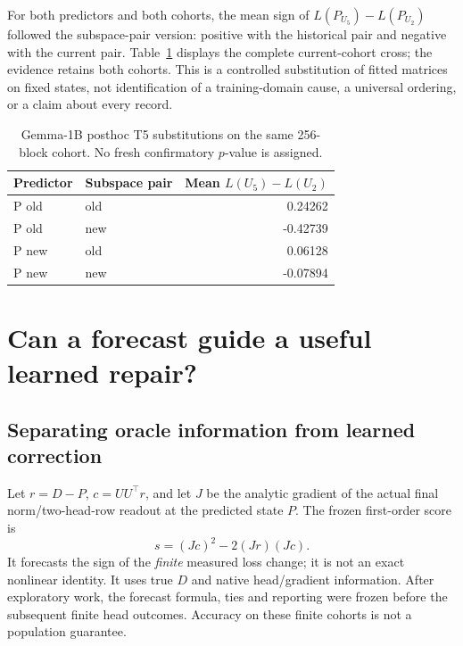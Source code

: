 For both predictors and both cohorts, the mean sign of $L(P_{U_5})-L(P_{U_2})$ followed the subspace-pair version: positive with the historical pair and negative with the current pair. Table~\ref{tab:crossed} displays the complete current-cohort cross; the evidence retains both cohorts. This is a controlled substitution of fitted matrices on fixed states, not identification of a training-domain cause, a universal ordering, or a claim about every record.
\begin{table}[ht]\centering\small
\begin{tabular}{llr}\toprule Predictor & Subspace pair & Mean $L(U_5)-L(U_2)$\\\midrule
P old & old & 0.24262 \\
P old & new & -0.42739 \\
P new & old & 0.06128 \\
P new & new & -0.07894 \\
\bottomrule\end{tabular}
\caption{Gemma-1B posthoc T5 substitutions on the same 256-block cohort. No fresh confirmatory $p$-value is assigned.}\label{tab:crossed}
\end{table}

\section{Can a forecast guide a useful learned repair?}
\subsection{Separating oracle information from learned correction}

Let $r=D-P$, $c=UU^\top r$, and let $J$ be the analytic gradient of the actual final norm/two-head-row readout at the predicted state $P$. The frozen first-order score is
\[
 s=(Jc)^2-2(Jr)(Jc).
\]
It forecasts the sign of the \emph{finite} measured loss change; it is not an exact nonlinear identity. It uses true $D$ and native head/gradient information. After exploratory work, the forecast formula, ties and reporting were frozen before the subsequent finite head outcomes. Accuracy on these finite cohorts is not a population guarantee.

